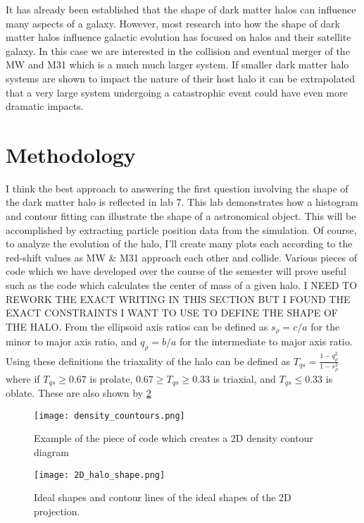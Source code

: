 \documentclass[fleqn,usenatbib]{mnras}
\begin{document}
\hspace{6mm}It has already been established that the shape of dark matter halos can influence many aspects of a galaxy. However, most research into how the shape of dark matter halos influence galactic evolution has focused on halos and their satellite galaxy. In this case we are interested in the collision and eventual merger of the MW and M31 which is a much much larger system. If smaller dark matter halo systems are shown to impact the nature of their host halo it can be extrapolated that a very large system undergoing a catastrophic event could have even more dramatic impacts.


\section{Methodology} \label{Method}
I think the best approach to answering the first question involving the shape of the dark matter halo is reflected in lab 7. This lab demonstrates how a histogram and contour fitting can illustrate the shape of a astronomical object. This will be accomplished by extracting particle position data from the simulation. Of course, to analyze the evolution of the halo, I'll create many plots each according to the red-shift values as MW \& M31 approach each other and collide. Various pieces of code which we have developed over the course of the semester will prove useful such as the code which calculates the center of mass of a given halo. I NEED TO REWORK THE EXACT WRITING IN THIS SECTION BUT I FOUND THE EXACT CONSTRAINTS I WANT TO USE TO DEFINE THE SHAPE OF THE HALO. From \cite{Garavito-Camargo_2021} the ellipsoid axis ratios can be defined as $s_\rho = c/a$ for the minor to major axis ratio, and $q_\rho = b/a$ for the intermediate to major axis ratio. Using these definitions the triaxality of the halo can be defined as $T_{qs} = \frac{1-q_{\rho}^2}{1-s_{\rho}^2}$ where if $T_{qs} \ge 0.67$ is prolate, $0.67 \ge T_{qs} \ge 0.33$ is triaxial, and $T_{qs} \le 0.33$ is oblate. These are also shown by \ref{fig:shapes}


\begin{figure}
	\texttt{[image: density\_countours.png]}
    \caption{Example of the piece of code which creates a 2D density contour diagram}
    \label{fig:density_code}
\end{figure}
\begin{figure}
	\texttt{[image: 2D\_halo\_shape.png]}
    \caption{Ideal shapes and contour lines of the ideal shapes of the 2D projection.}
    \label{fig:shapes}
\end{figure}
\end{document}
